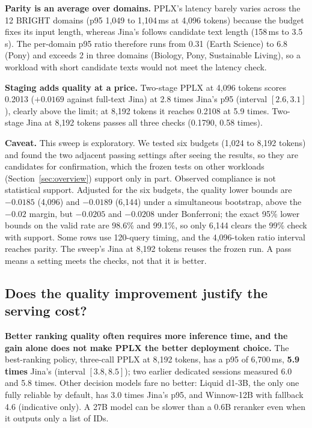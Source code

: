 \documentclass[conference]{IEEEtran}
\begin{document}
{\textbf{Parity is an average over domains.} PPLX's latency barely varies across the 12 BRIGHT domains (p95 1,049 to 1,104\,ms at 4,096 tokens) because the budget fixes its input length, whereas Jina's follows candidate text length (158\,ms to 3.5\,s). The per-domain p95 ratio therefore runs from 0.31 (Earth Science) to 6.8 (Pony) and exceeds 2 in three domains (Biology, Pony, Sustainable Living), so a workload with short candidate texts would not meet the latency check.

\textbf{Staging adds quality at a price.} Two-stage PPLX at 4,096 tokens scores 0.2013 ($+0.0169$ against full-text Jina) at 2.8 times Jina's p95 (interval $[2.6,3.1]$), clearly above the limit; at 8,192 tokens it reaches 0.2108 at 5.9 times. Two-stage Jina at 8,192 tokens passes all three checks (0.1790, 0.58 times).

\textbf{Caveat.} This sweep is exploratory. We tested six budgets (1,024 to 8,192 tokens) and found the two adjacent passing settings after seeing the results, so they are candidates for confirmation, which the frozen tests on other workloads (Section~\ref{sec:overview}) support only in part. Observed compliance is not statistical support. Adjusted for the six budgets, the quality lower bounds are $-0.0185$ (4,096) and $-0.0189$ (6,144) under a simultaneous bootstrap, above the $-0.02$ margin, but $-0.0205$ and $-0.0208$ under Bonferroni; the exact 95\% lower bounds on the valid rate are 98.6\% and 99.1\%, so only 6,144 clears the 99\% check with support. Some rows use 120-query timing, and the 4,096-token ratio interval reaches parity. The sweep's Jina at 8,192 tokens reuses the frozen run. A pass means a setting meets the checks, not that it is better.

\subsection{Does the quality improvement justify the serving cost?}\label{sec:rq3}
\textbf{Better ranking quality often requires more inference time, and the gain alone does not make PPLX the better deployment choice.} The best-ranking policy, three-call PPLX at 8,192 tokens, has a p95 of 6,700\,ms, \textbf{5.9 times} Jina's (interval $[3.8,8.5]$); two earlier dedicated sessions measured 6.0 and 5.8 times. Other decision models fare no better: Liquid d1-3B, the only one fully reliable by default, has 3.0 times Jina's p95, and Winnow-12B with fallback 4.6 (indicative only). A 27B model can be slower than a 0.6B reranker even when it outputs only a list of IDs.

}
\end{document}
